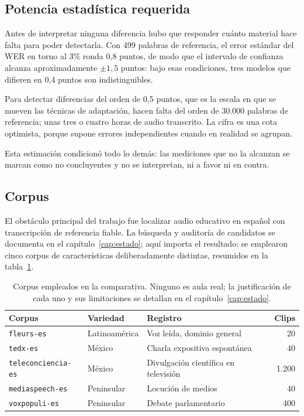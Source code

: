 \subsection{Potencia estadística requerida}
\label{sec:potencia}

Antes de interpretar ninguna diferencia hubo que responder cuánto material hace falta para
poder detectarla. Con 499 palabras de referencia, el error estándar del WER en torno al
3\% ronda 0,8 puntos, de modo que el intervalo de confianza alcanza aproximadamente
$\pm 1,5$ puntos: bajo esas condiciones, tres modelos que difieren en 0,4 puntos son
indistinguibles.

Para detectar diferencias del orden de 0,5 puntos, que es la escala en que se mueven las
técnicas de adaptación, hacen falta del orden de 30.000 palabras de referencia; unas tres
o cuatro horas de audio transcrito. La cifra es una cota optimista, porque supone errores
independientes cuando en realidad se agrupan.

Esta estimación condicionó todo lo demás: las mediciones que no la alcanzan se marcan como
no concluyentes y no se interpretan, ni a favor ni en contra.

\subsection{Corpus}

El obstáculo principal del trabajo fue localizar audio educativo en español con
transcripción de referencia fiable. La búsqueda y auditoría de candidatos se documenta en
el capítulo~\ref{cap:estado}; aquí importa el resultado: se emplearon cinco corpus de
características deliberadamente distintas, resumidos en la tabla~\ref{tab:corpus-usados}.

\begin{table}[h]
\centering
\small
\begin{tabular}{|l|l|l|r|}
\hline
\textbf{Corpus} & \textbf{Variedad} & \textbf{Registro} & \textbf{Clips} \\
\hline
\texttt{fleurs-es} & Latinoamérica & Voz leída, dominio general & 20 \\
\texttt{tedx-es} & México & Charla expositiva espontánea & 40 \\
\texttt{teleconciencia-es} & México & Divulgación científica en televisión & 1.200 \\
\texttt{mediaspeech-es} & Peninsular & Locución de medios & 40 \\
\texttt{voxpopuli-es} & Peninsular & Debate parlamentario & 400 \\
\hline
\end{tabular}
\caption{Corpus empleados en la comparativa. Ninguno es aula real; la justificación de
cada uno y sus limitaciones se detallan en el capítulo~\ref{cap:estado}.}
\label{tab:corpus-usados}
\end{table}

